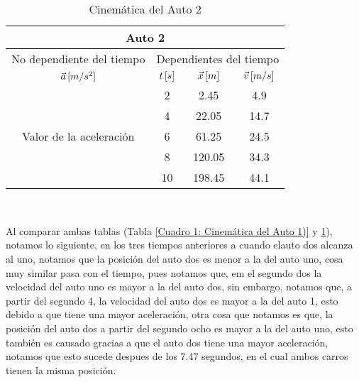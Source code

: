 \documentclass[letterpaper, 12pt]{article}
\begin{document}
\begin{enumerate}
\begin{enumerate}
            \begin{table}[H]
            \centering
                    \begin{tabular}{c|c|c|c|c|c}\hline \hline
                       \multicolumn{6}{c}{Auto 2}\\\hline
                       \multicolumn{3}{l|}{No dependiente del tiempo} & \multicolumn{3}{|l}{Dependientes del tiempo}\\\hline
                       \multicolumn{3}{c|}{$\vec{a}\thinspace [m/s^{2}]$} & {$t\thinspace[s]$} & {$\vec{x}\thinspace[m]$} & {$\vec{v}\thinspace[m/s]$}\\\hline
                       \multicolumn{3}{c|}{} & 2 & 2.45 & 4.9 \\\cline{4-6}
                       \multicolumn{3}{c|}{} & 4 & 22.05 & 14.7 \\\cline{4-6}
                       \multicolumn{3}{c|}{Valor de la aceleración} & 6 & 61.25 & 24.5 \\\cline{4-6}
                       \multicolumn{3}{c|}{} & 8 & 120.05 & 34.3 \\\cline{4-6}
                       \multicolumn{3}{c|}{} & 10 & 198.45 & 44.1 \\\hline \hline
                    \end{tabular}\\
                    \caption{Cinemática del Auto 2}
                    \label{Cuadro 2: Cinemática del Auto 2)}
            \end{table}
            
            Al comparar ambas tablas (Tabla \ref{Cuadro 1: Cinemática del Auto 1)} y \ref{Cuadro 2: Cinemática del Auto 2)}), notamos lo siguiente, en los tres tiempos anteriores a cuando elauto dos alcanza al uno, notamos que la posición del auto dos es menor a la del auto uno, cosa muy similar pasa con el tiempo, pues notamos que, em el segundo dos la velocidad del auto uno es mayor a la del auto dos, sin embargo, notamos que, a partir del segundo 4, la velocidad del auto dos es mayor a la del auto 1, esto debido a que tiene una mayor aceleración, otra cosa que notamos es que, la posición del auto dos a partir del segundo ocho es mayor a la del auto uno, esto también es causado gracias a que el auto dos tiene una mayor aceleración, notamos que esto sucede despues de los 7.47 segundos, en el cual ambos carros tienen la misma posición.\\
            
        \end{enumerate}
        

\end{enumerate}
\end{document}
